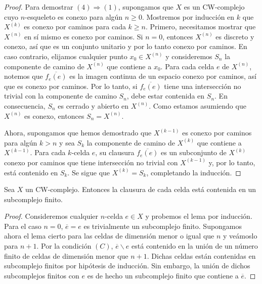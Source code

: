 \begin{proof}
	Para demostrar $(4) \Rightarrow (1)$, supongamos que $X$ es un CW-complejo cuyo
	$n$-esqueleto es conexo para algún $n \geq 0$. Mostremos por inducción en $k$
	que $X^{(k)}$ es conexo por caminos para cada $k \geq n$. Primero, necesitamos
	mostrar que $X^{(n)}$ en sí mismo es conexo por caminos. Si $n = 0$, entonces
	$X^{(n)}$ es discreto y conexo, así que es un conjunto unitario y por lo tanto
	conexo por caminos. En caso contrario, elijamos cualquier punto $x_{0} \in X^{(n)}$
	y consideremos $S_{n}$ la componente de camino de $X^{(n)}$ que contiene a $x_{0}$.
	Para cada celda $e$ de $X^{(n)}$, notemos que $\overline{f_e(e)}$ es la imagen
	continua de un espacio conexo por caminos, así que es conexo por caminos. Por lo
	tanto, si $\overline{f_e(e)}$ tiene una intersección no trivial con la
	componente de camino $S_{n}$, debe estar contenida en $S_{n}$. En consecuencia,
	$S_{n}$ es cerrado y abierto en $X^{(n)}$. Como estamos asumiendo que
	$X^{(n)}$ es conexo, entonces $S_{n} = X^{(n)}$.
	
	Ahora, supongamos que hemos demostrado que $X^{(k-1)}$ es conexo por caminos
	para algún $k > n$ y sea $S_{k}$ la componente de camino de $X^{(k)}$ que
	contiene a $X^{(k-1)}$. Para cada $k$-celda $e$, su clausura
	$\overline{f_e(e)}$ es un subconjunto de $X^{(k)}$ conexo por caminos que
	tiene intersección no trivial con $X^{(k-1)}$ y, por lo tanto, está contenido
	en $S_{k}$. Se sigue que $X^{(k)}= S_{k}$, completando la inducción.
\end{proof}

\begin{lema}
	\label{lem:cw-cl-finite-subcomplex} Sea $X$ un CW-complejo. Entonces la
	clausura de cada celda está contenida en un subcomplejo finito.
\end{lema}
\begin{proof}
	Consideremos cualquier $n$-celda $e \in X$ y probemos el lema por inducción.
	Para el caso $n=0$, $\overline{e}= e$ es trivialmente un subcomplejo finito.
	Supongamos ahora el lema cierto para las celdas de dimensión menor o igual que
	$n$ y veámoslo para $n+1$. Por la condición $(C)$, $\overline{e}\backslash e$
	está contenido en la unión de un número finito de celdas de dimensión menor
	que $n+1$. Dichas celdas están contenidas en subcomplejo finitos por hipótesis
	de inducción. Sin embargo, la unión de dichos subcomplejos finitos con $e$ es de
	hecho un subcomplejo finito que contiene a $\overline{e}$.
\end{proof}

